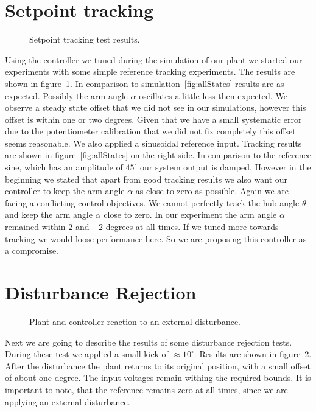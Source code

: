 \documentclass[ twoside,openright,titlepage,numbers=noenddot,headinclude,%
                footinclude=true,cleardoublepage=empty,abstractoff, %
                BCOR=5mm,paper=a4,fontsize=11pt,%
                ngerman,american,%
                ]{scrreprt}
\begin{document}
{\section{Setpoint tracking}
\begin{figure}


\caption{Setpoint tracking test results.}
\label{fig:setPoint}
\end{figure}
Using the controller we tuned during the simulation of our plant we started our experiments with some simple reference tracking experiments. The results are shown in figure~\ref{fig:setPoint}. In comparison to simulation~\ref{fig:allStates} results are as expected. Possibly the arm angle $\alpha$ oscillates a little less then expected. We observe a steady state offset that we did not see in our simulations, however this offset is within one or two degrees. Given that we have a small systematic error due to the potentiometer calibration that we did not fix completely this offset seems reasonable. We also applied a sinusoidal reference input. Tracking results are shown in figure~\ref{fig:allStates} on the right side. In comparison to the reference sine, which has an amplitude of $45^\circ$ our system output is damped. However in the beginning we stated that apart from good tracking results we also want our controller to keep the arm angle $\alpha$ as close to zero as possible. Again we are facing a conflicting control objectives. We cannot perfectly track the hub angle $\theta$ and keep the arm angle $\alpha$ close to zero. In our experiment the arm angle $\alpha$ remained within $2$ and $-2$ degrees at all times. If we tuned more towards tracking we would loose performance here. So we are proposing this controller as a compromise. 

\section{Disturbance Rejection}
\begin{figure}

\caption{Plant and controller reaction to an external disturbance.}
\label{fig:disturbance}
\end{figure}
Next we are going to describe the results of some disturbance rejection tests. During these test we applied a small kick of $\approx 10^\circ$. Results are shown in figure~\ref{fig:disturbance}. After the disturbance the plant returns to its original position, with a small offset of about one degree. The input voltages remain withing the required bounds. It is important to note, that the reference remains zero at all times, since we are applying an external disturbance.

}
\end{document}
